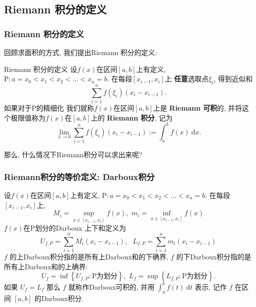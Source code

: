 \documentclass[
10pt,
aspectratio=43,
]{beamer}
\begin{document}
\subsection{Riemann 积分的定义}
\begin{frame}
	\frametitle{Riemann 积分的定义}
	\everymath{\displaystyle}
	\pause
	回顾求面积的方式, 我们提出Riemann 积分的定义:
	\pause
	\begin{block}{Riemann 积分的定义}
		设$f(x)$在区间$[a,b]$上有定义, $\mathrm{P}:a=x_0<x_1<x_2<\ldots<x_n=b$.
		在每段$[x_{i-1},x_i]$上 {\bf 任意}选取点$\xi_i$, 得到近似和
		$$
			\sum_{i=1}^n f(\xi_i)(x_i-x_{i-1}).
		$$
		如果对于$\mathrm{P}$的精细化
		我们就称$f(x)$在区间$[a,b]$上是 {\bf Riemann 可积}的, 并将这个极限值称为$f(x)$在$[a,b]$上的 {\bf Riemann 积分}, 记为
		\[
			\lim_{\lambda\to 0} \sum_{i=1}^n f(\xi_i)(x_i-x_{i-1}) := \int_a^b f(x)\mathrm{~d} x.
		\]
	\end{block}
	\pause
	那么, 什么情况下Riemann积分可以求出来呢?
\end{frame}

\begin{frame}
	\frametitle{Riemann积分的等价定义: Darboux积分}
	\begin{block}{}
		设$f(x)$在区间$[a,b]$上有定义, $\mathrm{P}:a=x_0<x_1<x_2<\ldots<x_n=b$.
		在每段$[x_{i-1},x_i]$上,
		$$M_i=\sup _{x \in\left[x_{i-1}, x_i\right]} f(x),\,\,m_i=\inf _{x \in\left[x_{i-1}, x_i\right]} f(x)$$
		\pause  $f(x)$在$\mathrm{P}$划分的Darboux 上下和定义为
		$$
			U_{f, P}=\sum_{i=1}^n M_i\left(x_i-x_{i-1}\right),\,\,\,\,L_{f, P}=\sum_{i=1}^n m_i\left(x_i-x_{i-1}\right)
		$$
		\pause  $f$ 的上Darboux积分指的是所有上Darboux和的下确界, $f$ 的下Darboux积分指的是所有上Darboux和的上确界:
		$$
			U_f=\inf \left\{U_{f, P}: \mathrm{P}\text{为划分}  \right\},\,\,L_f=\sup \left\{L_{f, P}: \mathrm{P}\text{为划分}\right\}.
		$$
		\pause  如果 $U_f=L_f$ 那么 $f$ 就称作Darboux可积的, 并用 $\int_a^b f(t) \mathrm{~d} t$ 表示, 记作 $f$ 在区间 $[a, b]$ 的Darboux积分.
	\end{block}
\end{frame}
\end{document}
